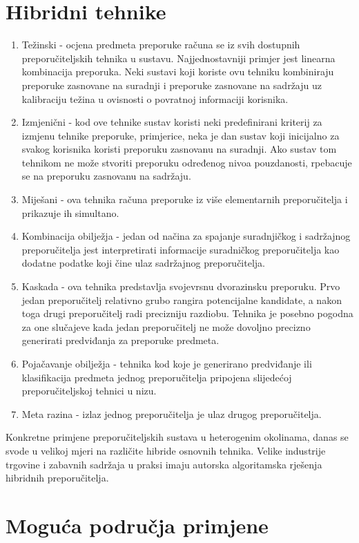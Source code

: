 \documentclass[times, utf8, diplomski, numeric]{fer}
\begin{document}
\section{Hibridni tehnike}
\begin{enumerate}
  \item Težinski - ocjena predmeta preporuke računa se iz svih dostupnih
  preporučiteljskih tehnika u sustavu. Najjednostavniji primjer jest linearna
  kombinacija preporuka. Neki sustavi koji koriste ovu tehniku kombiniraju
  preporuke zasnovane na suradnji i preporuke zasnovane na sadržaju uz
  kalibraciju težina u ovisnosti o povratnoj informaciji korisnika.
  \item Izmjenični - kod ove tehnike sustav koristi neki predefinirani kriterij
  za izmjenu tehnike preporuke, primjerice, neka je dan sustav koji inicijalno
  za svakog korisnika koristi preporuku zasnovanu na suradnji. Ako sustav tom
  tehnikom ne može stvoriti preporuku određenog nivoa pouzdanosti, rpebacuje se
  na preporuku zasnovanu na sadržaju.
  \item Miješani - ova tehnika računa preporuke iz više elementarnih
  preporučitelja i prikazuje ih simultano.
  \item Kombinacija obilježja - jedan od načina za spajanje suradnjičkog i
  sadržajnog preporučitelja jest interpretirati informacije suradničkog
  preporučitelja kao dodatne podatke koji čine ulaz sadržajnog preporučitelja.
  \item Kaskada - ova tehnika predstavlja svojevrsnu dvorazinsku preporuku. Prvo
  jedan preporučitelj relativno grubo rangira potencijalne kandidate, a nakon
  toga drugi preporučitelj radi precizniju razdiobu. Tehnika je posebno pogodna
  za one slučajeve kada jedan preporučitelj ne može dovoljno precizno generirati
  predviđanja za preporuke predmeta.
  \item Pojačavanje obilježja - tehnika kod koje je generirano predviđanje ili
  klasifikacija predmeta jednog preporučitelja pripojena slijedećoj
  preporučiteljskoj tehnici u nizu.
  \item Meta razina - izlaz jednog preporučitelja je ulaz drugog preporučitelja.
\end{enumerate}

Konkretne primjene preporučiteljskih sustava u heterogenim okolinama, danas se
svode u velikoj mjeri na različite hibride osnovnih tehnika. Velike industrije
trgovine i zabavnih sadržaja u praksi imaju autorska algoritamska rješenja
hibridnih preporučitelja.
\section{Moguća područja primjene}
\end{document}
